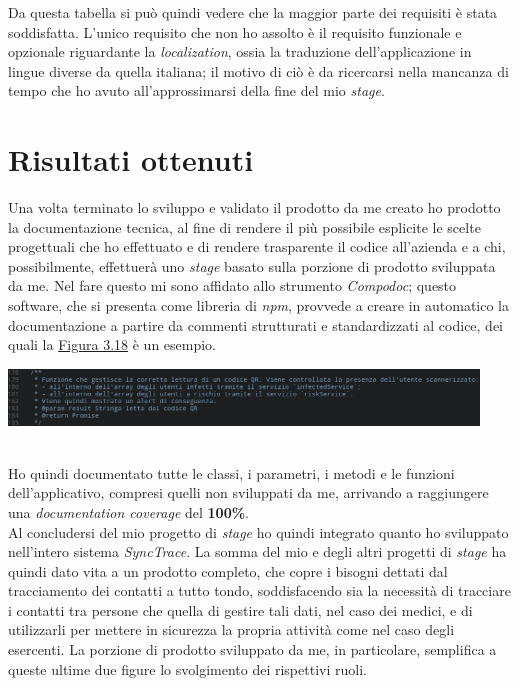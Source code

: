 Da questa tabella si può quindi vedere che la maggior parte dei requisiti è stata soddisfatta. L'unico requisito che non ho assolto è il requisito funzionale e opzionale riguardante la \textit{localization}, ossia la traduzione dell'applicazione in lingue diverse da quella italiana; il motivo di ciò è da ricercarsi nella mancanza di tempo che ho avuto all'approssimarsi della fine del mio \textit{stage}.


\section{Risultati ottenuti}

Una volta terminato lo sviluppo e validato il prodotto da me creato ho prodotto la documentazione tecnica, al fine di rendere il più possibile esplicite le scelte progettuali che ho effettuato e di rendere trasparente il codice all'azienda e a chi, possibilmente, effettuerà uno \textit{stage} basato sulla porzione di prodotto sviluppata da me. Nel fare questo mi sono affidato allo strumento \textit{Compodoc}; questo software, che si presenta come libreria di \textit{npm}, provvede a creare in automatico la documentazione a partire da commenti strutturati e standardizzati al codice, dei quali la \hyperref[img:compodocdoc]{Figura 3.18} è un esempio.\\

\begin{minipage}{\linewidth}
  \label{img:compodocdoc}
  \centering
    \includegraphics[height=1.5cm]{immagini/compodocdoc}
\end{minipage} \\

Ho quindi documentato tutte le classi, i parametri, i metodi e le funzioni dell'applicativo, compresi quelli non sviluppati da me, arrivando a raggiungere una \textit{documentation coverage} del \textbf{100\%}. \\

Al concludersi del mio progetto di \textit{stage} ho quindi integrato quanto ho sviluppato nell'intero sistema \textit{SyncTrace}. La somma del mio e degli altri progetti di \textit{stage} ha quindi dato vita a un prodotto completo, che copre i bisogni dettati dal tracciamento dei contatti a tutto tondo, soddisfacendo sia la necessità di tracciare i contatti tra persone che quella di gestire tali dati, nel caso dei medici, e di utilizzarli per mettere in sicurezza la propria attività come nel caso degli esercenti. La porzione di prodotto sviluppato da me, in particolare, semplifica a queste ultime due figure lo svolgimento dei rispettivi ruoli. \\
